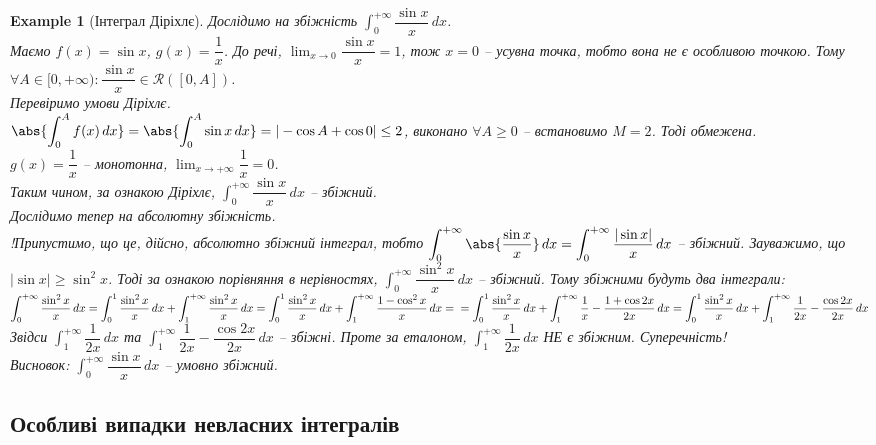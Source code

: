 \documentclass[a4paper, 10pt]{article}
\def\huge{\displaystyle}
\theoremstyle{theoremdd}
\theoremstyle{theoremdd}
\theoremstyle{theoremdd}
\theoremstyle{theoremdd}
\theoremstyle{theoremdd}
\newtheorem{example}[theorem]{Example}
\theoremstyle{theoremdd}
\theoremstyle{theoremdd}
\theoremstyle{theoremdd}
\theoremstyle{theoremdd}
\begin{document}
\begin{example}[Інтеграл Діріхлє]
Дослідимо на збіжність $\huge\int_0^{+\infty} \dfrac{\sin x}{x}\,dx$.\\
Маємо $f(x) = \sin x$, $g(x) = \dfrac{1}{x}$. До речі, $\huge\lim_{x \to 0} \dfrac{\sin x}{x} = 1$, тож $x = 0$ -- усувна точка, тобто вона не є особливою точкою. Тому $\forall A \in [0,+\infty): \dfrac{\sin x}{x} \in \mathcal{R}([0,A])$.\\
Перевіримо умови Діріхлє.\\
$\abs{\huge\int_0^{A} f(x)\,dx} = \abs{\huge\int_0^A \sin x \,dx} = |-\cos A + \cos 0| \leq 2$, виконано $\forall A \geq 0$ -- встановимо $M = 2$. Тоді обмежена.\\
$g(x) = \dfrac{1}{x}$ -- монотонна, $\huge\lim_{x \to +\infty} \dfrac{1}{x} = 0$.\\
Таким чином, за ознакою Діріхлє,  $\huge\int_0^{+\infty} \dfrac{\sin x}{x}\,dx$  -- збіжний.
\bigskip \\
Дослідимо тепер на абсолютну збіжність.\\
!Припустимо, що це, дійсно, абсолютно збіжний інтеграл, тобто
$\huge\int_0^{+\infty} \abs{\dfrac{\sin x}{x}}\,dx = \huge\int_0^{+\infty} \dfrac{|\sin x|}{x}\,dx$ -- збіжний. Зауважимо, що $|\sin x| \geq \sin^2 x$. Тоді за ознакою порівняння в нерівностях, $\huge\int_0^{+\infty} \dfrac{\sin^2 x}{x}\,dx$ -- збіжний. Тому збіжними будуть два інтеграли:\\
$\huge\int_0^{+\infty} \dfrac{\sin^2 x}{x}\,dx = \huge\int_0^1 \dfrac{\sin^2 x}{x}\,dx + \huge\int_1^{+\infty} \dfrac{\sin^2 x}{x}\,dx =
\huge\int_0^1 \dfrac{\sin^2 x}{x}\,dx + \huge\int_1^{+\infty} \dfrac{1 - \cos^2 x}{x}\,dx = \\ = \huge\int_0^1 \dfrac{\sin^2 x}{x}\,dx + \huge\int_1^{+\infty} \dfrac{1}{x} - \dfrac{1+\cos 2x}{2x} \,dx = \huge\int_0^1 \dfrac{\sin^2 x}{x}\,dx + \huge\int_1^{+\infty} \dfrac{1}{2x} - \dfrac{\cos 2x}{2x} \,dx$\\
Звідси $\huge\int_1^{+\infty} \dfrac{1}{2x} \,dx$ та $\huge\int_1^{+\infty} \dfrac{1}{2x}-\dfrac{\cos 2x}{2x} \,dx$ -- збіжні. Проте за еталоном, $\huge\int_1^{+\infty} \dfrac{1}{2x} \,dx$ НЕ є збіжним. Суперечність!\\
Висновок: $\huge\int_0^{+\infty} \dfrac{\sin x}{x}\,dx$ -- умовно збіжний.
\end{example}

\subsection{Особливі випадки невласних інтегралів}
\end{document}
